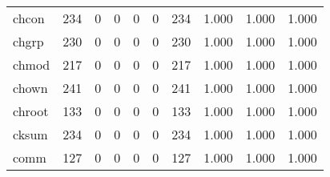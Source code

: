 \begin{longtable}{lp{2.0cm}p{2.0cm}p{2.0cm}p{2.0cm}p{2.0cm}p{2.0cm}p{2.0cm}p{2.0cm}p{2.0cm}}
chcon     &                    234 &                                  0 &                                 0 &                                0 &                                 0 &                             234 &                                1.000 &                                  1.000 &                                1.000 \\
chgrp     &                    230 &                                  0 &                                 0 &                                0 &                                 0 &                             230 &                                1.000 &                                  1.000 &                                1.000 \\
chmod     &                    217 &                                  0 &                                 0 &                                0 &                                 0 &                             217 &                                1.000 &                                  1.000 &                                1.000 \\
chown     &                    241 &                                  0 &                                 0 &                                0 &                                 0 &                             241 &                                1.000 &                                  1.000 &                                1.000 \\
chroot    &                    133 &                                  0 &                                 0 &                                0 &                                 0 &                             133 &                                1.000 &                                  1.000 &                                1.000 \\
cksum     &                    234 &                                  0 &                                 0 &                                0 &                                 0 &                             234 &                                1.000 &                                  1.000 &                                1.000 \\
comm      &                    127 &                                  0 &                                 0 &                                0 &                                 0 &                             127 &                                1.000 &                                  1.000 &                                1.000 \\

\end{longtable}
